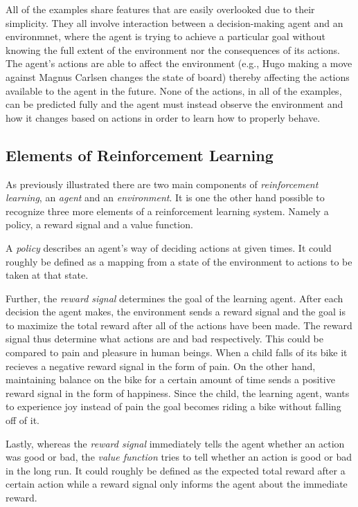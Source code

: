 \documentclass[titlepage]{article}
\begin{document}
\newpage

\noindent
All of the examples share features that are easily overlooked due to their simplicity. They all involve interaction between a decision-making agent and an environmnet, where the agent is trying to achieve a particular goal without knowing the full extent of the environment nor the consequences of its actions. The agent's actions are able to affect the environment (e.g., Hugo making a move against Magnus Carlsen changes the state of board) thereby affecting the actions available to the agent in the future. None of the actions, in all of the examples, can be predicted fully and the agent must instead observe the environment and how it changes based on actions in order to learn how to properly behave. 

\subsection{Elements of Reinforcement Learning}

\vskip 0.3cm

As previously illustrated there are two main components of \emph{reinforcement learning}, an \emph{agent} and an \emph{environment}. It is one the other hand possible to recognize three more elements of a reinforcement learning system. Namely a policy, a reward signal and a value function. 

\vskip 0.3cm

\noindent
A \emph{policy} describes an agent's way of deciding actions at given times. It could roughly be defined as a mapping from a state of the environment to actions to be taken at that state. 
\vskip 0.3cm

\noindent
Further, the \emph{reward signal} determines the goal of the learning agent. After each decision the agent makes, the environment sends a reward signal and the goal is to maximize the total reward after all of the actions have been made. The reward signal thus determine what actions are and bad respectively. This could be compared to pain and pleasure in human beings. When a child falls of its bike it recieves a negative reward signal in the form of pain. On the other hand, maintaining balance on the bike for a certain amount of time sends a positive reward signal in the form of happiness. Since the child, the learning agent, wants to experience joy instead of pain the goal becomes riding a bike without falling off of it. 

\vskip 0.3cm

\noindent
Lastly, whereas the \emph{reward signal} immediately tells the agent whether an action was good or bad, the \emph{value function} tries to tell whether an action is good or bad in the long run. It could roughly be defined as the expected total reward after a certain action while a reward signal only informs the agent about the immediate reward. 
\end{document}
